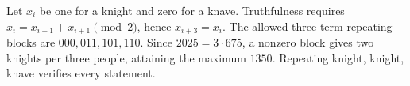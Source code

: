 Let $x_i$ be one for a knight and zero for a knave. Truthfulness requires $x_i=x_{i-1}+x_{i+1}\pmod2$, hence $x_{i+3}=x_i$. The allowed three-term repeating blocks are $000,011,101,110$. Since $2025=3\cdot675$, a nonzero block gives two knights per three people, attaining the maximum $\boxed{1350}$. Repeating knight, knight, knave verifies every statement.
